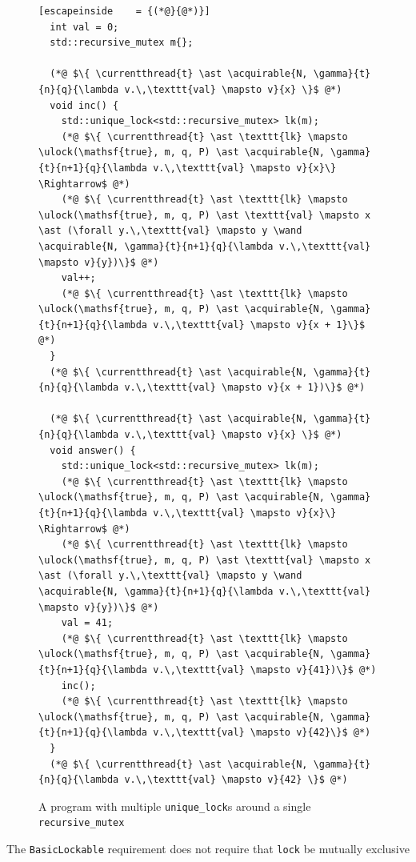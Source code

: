 \documentclass[acmsmall,screen,review,anonymous]{acmart}
\begin{document}
\begin{figure}[htb]
\begin{lstlisting}[escapeinside    = {(*@}{@*)}]
  int val = 0;
  std::recursive_mutex m{};

  (*@ $\{ \currentthread{t} \ast \acquirable{N, \gamma}{t}{n}{q}{\lambda v.\,\texttt{val} \mapsto v}{x} \}$ @*)
  void inc() {
    std::unique_lock<std::recursive_mutex> lk(m);
    (*@ $\{ \currentthread{t} \ast \texttt{lk} \mapsto \ulock(\mathsf{true}, m, q, P) \ast \acquirable{N, \gamma}{t}{n+1}{q}{\lambda v.\,\texttt{val} \mapsto v}{x}\} \Rightarrow$ @*)
    (*@ $\{ \currentthread{t} \ast \texttt{lk} \mapsto \ulock(\mathsf{true}, m, q, P) \ast \texttt{val} \mapsto x \ast (\forall y.\,\texttt{val} \mapsto y \wand \acquirable{N, \gamma}{t}{n+1}{q}{\lambda v.\,\texttt{val} \mapsto v}{y})\}$ @*)
    val++;
    (*@ $\{ \currentthread{t} \ast \texttt{lk} \mapsto \ulock(\mathsf{true}, m, q, P) \ast \acquirable{N, \gamma}{t}{n+1}{q}{\lambda v.\,\texttt{val} \mapsto v}{x + 1}\}$ @*)
  }
  (*@ $\{ \currentthread{t} \ast \acquirable{N, \gamma}{t}{n}{q}{\lambda v.\,\texttt{val} \mapsto v}{x + 1})\}$ @*)

  (*@ $\{ \currentthread{t} \ast \acquirable{N, \gamma}{t}{n}{q}{\lambda v.\,\texttt{val} \mapsto v}{x} \}$ @*)
  void answer() {
    std::unique_lock<std::recursive_mutex> lk(m);
    (*@ $\{ \currentthread{t} \ast \texttt{lk} \mapsto \ulock(\mathsf{true}, m, q, P) \ast \acquirable{N, \gamma}{t}{n+1}{q}{\lambda v.\,\texttt{val} \mapsto v}{x}\} \Rightarrow$ @*)
    (*@ $\{ \currentthread{t} \ast \texttt{lk} \mapsto \ulock(\mathsf{true}, m, q, P) \ast \texttt{val} \mapsto x \ast (\forall y.\,\texttt{val} \mapsto y \wand \acquirable{N, \gamma}{t}{n+1}{q}{\lambda v.\,\texttt{val} \mapsto v}{y})\}$ @*)
    val = 41;
    (*@ $\{ \currentthread{t} \ast \texttt{lk} \mapsto \ulock(\mathsf{true}, m, q, P) \ast \acquirable{N, \gamma}{t}{n+1}{q}{\lambda v.\,\texttt{val} \mapsto v}{41})\}$ @*)
    inc();
    (*@ $\{ \currentthread{t} \ast \texttt{lk} \mapsto \ulock(\mathsf{true}, m, q, P) \ast \acquirable{N, \gamma}{t}{n+1}{q}{\lambda v.\,\texttt{val} \mapsto v}{42}\}$ @*)
  }
  (*@ $\{ \currentthread{t} \ast \acquirable{N, \gamma}{t}{n}{q}{\lambda v.\,\texttt{val} \mapsto v}{42} \}$ @*)
\end{lstlisting}
\caption{A program with multiple \lstinline{unique_lock}s around a single \lstinline{recursive_mutex}}
\label{unique-recursive}
\end{figure}
The \lstinline{BasicLockable} requirement does not require that \lstinline{lock} be mutually exclusive%
\end{document}
